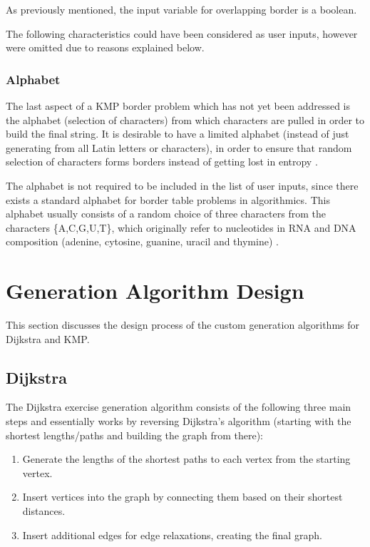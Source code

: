 \documentclass{l4proj}
\begin{document}
As previously mentioned, the input variable for overlapping border is a boolean.

The following characteristics could have been considered as user inputs, however were omitted due to reasons explained below.

\subsubsection{Alphabet}
\label{sec:alphabet}

The last aspect of a KMP border problem which has not yet been addressed is the alphabet (selection of characters) from which characters are pulled in order to build the final string. It is desirable to have a limited alphabet (instead of just generating from all Latin letters or characters), in order to ensure that random selection of characters forms borders instead of getting lost in entropy \cite{a}.
 
The alphabet is not required to be included in the list of user inputs, since there exists a standard alphabet for border table problems in algorithmics. This alphabet usually consists of a random choice of three characters from the characters \{A,C,G,U,T\}, which originally refer to nucleotides in RNA and DNA composition (adenine, cytosine, guanine, uracil and thymine) \cite{a}.

\section{Generation Algorithm Design}

This section discusses the design process of the custom generation algorithms for Dijkstra and KMP.

\subsection{Dijkstra}
\label{sec:dgen}

The Dijkstra exercise generation algorithm consists of the following three main steps and essentially works by reversing Dijkstra's algorithm (starting with the shortest lengths/paths and building the graph from there):

\begin{enumerate}
	\item
	Generate the lengths of the shortest paths to each vertex from the starting vertex.
	\item
	Insert vertices into the graph by connecting them based on their shortest distances.
	\item
	Insert additional edges for edge relaxations, creating the final graph.
\end{enumerate}
\end{document}
